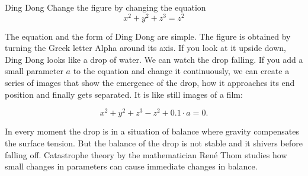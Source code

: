 \begin{surferPage}{Ding Dong}
Change the figure by changing the equation\\

\smallskip
\[x^2	+ y^2	+ z^3	= z^2\]

\singlespacing
The equation and the form of Ding Dong are simple. The figure is obtained by turning the Greek letter Alpha around its axis. If you look at it upside down, Ding Dong looks like a drop of water. We can watch the drop falling.
\newline
If you add a small parameter $a$ to the equation and change it continuously, we can create a series of images that show the emergence of the drop, how it approaches its end position and finally gets separated. It is like still images of a film:

\[x^2	+ y^2	+ z^3	-z^2+0.1\cdot a=0.\]

In every moment the drop is in a situation of balance where gravity compensates the surface tension. But the balance of the drop is not stable and it shivers before falling off. Catastrophe theory by the mathematician Ren\'e Thom studies how small changes in parameters can cause immediate changes in balance.
\end{surferPage}
